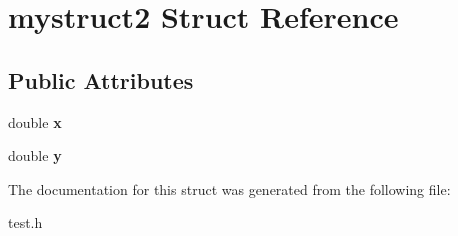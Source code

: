 \hypertarget{structmystruct2}{}\section{mystruct2 Struct Reference}
\label{structmystruct2}
\subsection*{Public Attributes}
\begin{DoxyCompactItemize}
\item 
double {\bfseries x}\hypertarget{structmystruct2_af67d03a01846373d6f2caa3c07e6522c}{}\label{structmystruct2_af67d03a01846373d6f2caa3c07e6522c}

\item 
double {\bfseries y}\hypertarget{structmystruct2_a92c03266cfca6aabb2373786ab68d4ba}{}\label{structmystruct2_a92c03266cfca6aabb2373786ab68d4ba}

\end{DoxyCompactItemize}


The documentation for this struct was generated from the following file\+:\begin{DoxyCompactItemize}
\item 
test.\+h\end{DoxyCompactItemize}
